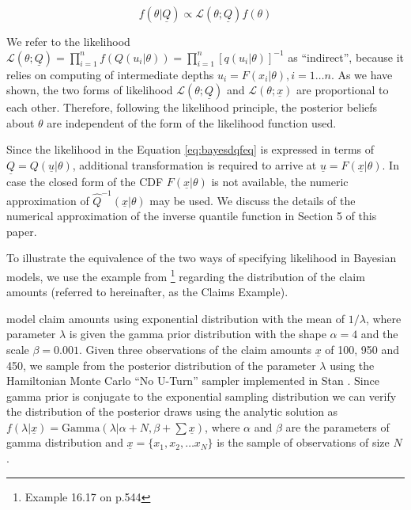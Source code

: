 \documentclass[
  12pt,
]{article}
\begin{document}
\[
f(\theta|\underline{Q}) \propto \mathcal{L}(\theta;\underline{Q})f(\theta)
\label{eq:bayesdqfeq}
\]

We refer to the likelihood \(\mathcal{L}(\theta;\underline{Q})=\prod_{i=1}^{n} f(Q(u_i|\theta))=\prod_{i=1}^n[q(u_i|\theta)]^{-1}\) as ``indirect'', because it relies on computing of intermediate depths \(u_i=F(x_i|\theta), i=1\dots n\). As we have shown, the two forms of likelihood \(\mathcal{L}(\theta;\underline{Q})\) and \(\mathcal{L}(\theta;\underline{x})\) are proportional to each other. Therefore, following the likelihood principle, the posterior beliefs about \(\theta\) are independent of the form of the likelihood function used.

Since the likelihood in the Equation \eqref{eq:bayesdqfeq} is expressed in terms of \(\underline {Q}=Q(\underline{u}|\theta)\), additional transformation is required to arrive at \(\underline{u}=F(\underline{x}|\theta)\). In case the closed form of the CDF \(F(\underline x|\theta)\) is not available, the numeric approximation of \(\widehat{Q}^{-1}(\underline{x}|\theta)\) may be used. We discuss the details of the numerical approximation of the inverse quantile function in Section 5 of this paper.

To illustrate the equivalence of the two ways of specifying likelihood in Bayesian models, we use the example from \citet{klugman2004LossModelsData}\footnote{Example 16.17 on p.544} regarding the distribution of the claim amounts (referred to hereinafter, as the Claims Example).

\citet{klugman2004LossModelsData} model claim amounts using exponential distribution with the mean of \(1/\lambda\), where parameter \(\lambda\) is given the gamma prior distribution with the shape \(\alpha=4\) and the scale \(\beta=0.001\). Given three observations of the claim amounts \(\underline x\) of 100, 950 and 450, we sample from the posterior distribution of the parameter \(\lambda\) using the Hamiltonian Monte Carlo ``No U-Turn'' sampler implemented in Stan \citep{standevelopmentteam2021RStanInterfaceStan}. Since gamma prior is conjugate to the exponential sampling distribution \citep{pratt1995IntroductionStatisticalDecision} we can verify the distribution of the posterior draws using the analytic solution as \(f(\lambda|\underline{x})=\text{Gamma}(\lambda| \alpha+N, \beta+\sum \underline{x})\), where \(\alpha\) and \(\beta\) are the parameters of gamma distribution and \(\underline{x}=\{x_1, x_2, \dots x_N\}\) is the sample of observations of size \(N\).
\end{document}
